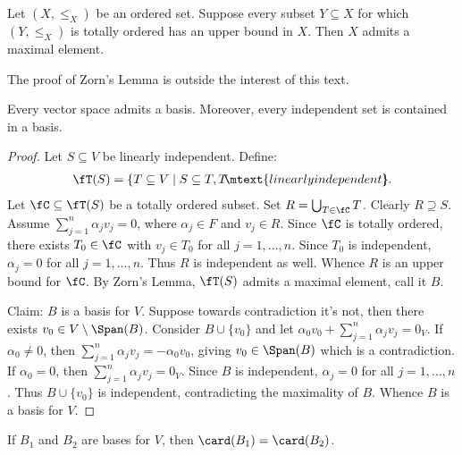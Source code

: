     \begin{lemma}
        Let $(X,\leq_X)$ be an ordered set. Suppose every subset $Y \subseteq X$ for which $(Y,\leq_X)$ is totally ordered has an upper bound in $X$. Then $X$ admits a maximal element.
    \end{lemma}

    The proof of Zorn's Lemma is outside the interest of this text. 

    \begin{theorem}
        Every vector space admits a basis. Moreover, every independent set is contained in a basis.
    \end{theorem}
        \begin{proof}
            Let $S \subseteq V$ be linearly independent. Define:
                \begin{equation*}
                \begin{split}
                    \fT(S) = \{T \subseteq V \mid S \subseteq T, T \hspace{-3pt}\mtext{linearly independent}\hspace{-5pt}\}.
                \end{split}
                \end{equation*}
            Let $\fC \subseteq \fT(S)$ be a totally ordered subset. Set $R = \bigcup_{T \in \fC} T$. Clearly $R \supseteq S$. Assume $\sum_{j = 1}^n \alpha_j v_j = 0$, where $\alpha_j \in F$ and $v_j \in R$. Since $\fC$ is totally ordered, there exists $T_0 \in \fC$ with $v_j \in T_0$ for all $j = 1,...,n$. Since $T_0$ is independent, $\alpha_j = 0$ for all $j = 1,...,n$. Thus $R$ is independent as well. Whence $R$ is an upper bound for $\fC$. By Zorn's Lemma, $\fT(S)$ admits a maximal element, call it $B$.

            Claim: $B$ is a basis for $V$. Suppose towards contradiction it's not, then there exists $v_0 \in V \setminus \Span(B)$. Consider $B \cup \{v_0\}$ and let $\alpha_0 v_0 + \sum_{j = 1}^n \alpha_j v_j = 0_V$. If $\alpha_0 \neq 0$, then $\sum_{j = 1}^n \alpha_j v_j = -\alpha_0 v_0 $, giving $v_0 \in \Span(B)$ which is a contradiction. If $\alpha_0 = 0$, then $\sum_{j = 1}^n \alpha_j v_j = 0_V$. Since $B$ is independent, $\alpha_j = 0$ for all $j =1,...,n$. Thus $B \cup \{v_0\}$ is independent, contradicting the maximality of $B$. Whence $B$ is a basis for $V$.
        \end{proof}

    \begin{theorem}
        If $B_1$ and $B_2$ are bases for $V$, then $\card(B_1) = \card(B_2)$.
    \end{theorem}

